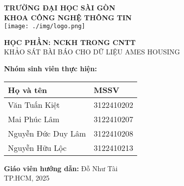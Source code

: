 

\begin{titlepage}
    \centering
    {\LARGE \textbf{TRƯỜNG ĐẠI HỌC SÀI GÒN}} \\[0.2cm]
    {\Large \textbf{KHOA CÔNG NGHỆ THÔNG TIN}} \\[0.5cm]
    
    \vspace{0.5cm} 
    \texttt{[image: ./img/logo.png]} %
    \vspace{0.5cm} %
    
    {\huge \textbf{HỌC PHẦN: NCKH TRONG CNTT}} \\[0.5cm]
    {\Large KHẢO SÁT BÀI BÁO CHO DỮ LIỆU AMES HOUSING} \\[0.5cm]

    \vspace{0.5cm} %
    
    \textbf{Nhóm sinh viên thực hiện:} \\[0.5cm]
    
    \begin{tabular}{|l|l|}
        \hline
        \textbf{Họ và tên} & \textbf{MSSV} \\ \hline
        Văn Tuấn Kiệt & 3122410202 \\ \hline
        Mai Phúc Lâm & 3122410207 \\ \hline
        Nguyễn Đức Duy Lâm & 3122410208 \\ \hline
        Nguyễn Hữu Lộc & 3122410213 \\ \hline
    \end{tabular}

    \vspace{0.5cm}

    \textbf{Giáo viên hướng dẫn:} Đỗ Như Tài \\[0.5cm]
    
    \vfill
    {\Large TP.HCM, 2025}
\end{titlepage}

